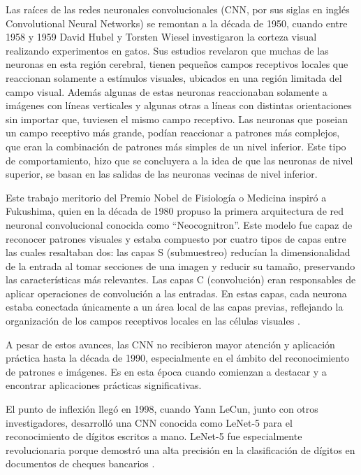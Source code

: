 Las raíces de las redes neuronales convolucionales (CNN, por sus siglas en inglés Convolutional Neural Networks) se remontan a la década de 1950, cuando entre 1958 y 1959 David Hubel y Torsten Wiesel investigaron la corteza visual realizando experimentos en  gatos. Sus estudios revelaron que muchas de las neuronas en esta región cerebral, tienen pequeños  campos  receptivos locales que reaccionan solamente a estímulos visuales,  ubicados en una región limitada del campo visual.\cite{hubel1959single} Además algunas de estas neuronas  reaccionaban solamente a imágenes con líneas verticales y algunas otras a líneas con distintas orientaciones sin importar que, tuviesen el mismo campo receptivo.  Las neuronas que poseian un campo receptivo más grande, podían reaccionar a patrones más complejos, que eran la combinación de  patrones más simples de un nivel inferior. Este tipo de comportamiento,  hizo que se concluyera a la idea de que las neuronas de nivel superior, se basan en las salidas de las neuronas vecinas de nivel inferior. \cite{hubel1959receptive}

Este trabajo meritorio del Premio Nobel de Fisiología o Medicina inspiró a Fukushima, quien en la década de 1980 propuso la primera arquitectura de red neuronal convolucional conocida como ``Neocognitron''. Este modelo fue capaz de reconocer patrones visuales y estaba compuesto por cuatro tipos de capas entre las cuales resaltaban dos: las capas S (submuestreo) reducían la dimensionalidad de la entrada al tomar secciones de una imagen y reducir su tamaño, preservando las características más relevantes. Las capas C (convolución) eran  responsables de aplicar operaciones de convolución a las entradas. En estas capas, cada neurona estaba conectada únicamente a un área local de las capas previas, reflejando la organización de los campos receptivos locales en las células visuales  \cite{fukushima1980neocognitron}. 

A pesar de estos avances, las CNN no recibieron mayor atención y aplicación práctica hasta la década de 1990, especialmente en el ámbito del reconocimiento de patrones e imágenes. Es en esta época cuando comienzan a destacar y a encontrar aplicaciones prácticas significativas.

El punto de inflexión llegó en 1998, cuando Yann LeCun, junto con otros investigadores, desarrolló una CNN conocida como LeNet-5 para el reconocimiento de dígitos escritos a mano. LeNet-5 fue especialmente revolucionaria porque demostró una alta precisión en la clasificación de dígitos en documentos de cheques bancarios \cite{lecun1998gradient}.

